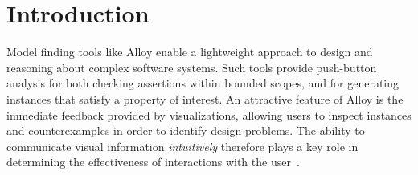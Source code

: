 \documentclass[runningheads]{llncs}
\begin{document}



\section{Introduction}
\label{introduction}

Model finding tools like Alloy enable a lightweight approach to design and reasoning about complex software systems. Such tools provide push-button analysis for both checking assertions within bounded scopes, and for generating instances that satisfy a property of interest. An attractive feature of Alloy is the immediate feedback provided by visualizations, allowing users to inspect instances and counterexamples in order to identify design problems. The ability to communicate visual information \emph{intuitively} therefore plays a key role in determining the effectiveness of interactions with the user~\cite{gammaitoni2014}.
\end{document}
